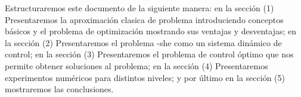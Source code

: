 Estructuraremos este documento de la siguiente manera: en la sección (1) Presentaremos la aproximación clasica de problema introduciendo conceptos básicos y el problema de optimización mostrando sus ventajas y desventajas; en la sección (2) Presentaremos el problema -she como un sistema dinámico de control; en la sección (3) Presentaremos el problema de control óptimo que nos permite obtener soluciones al problema; en la sección (4) Presentaremos experimentos numéricos para distintos niveles; y por último en la sección (5) mostraremos las conclusiones. 
